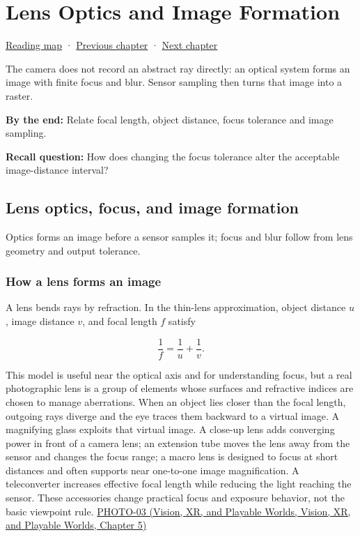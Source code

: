 \hypertarget{03-visual-computing-i-ch003}{}
\chapter{Lens Optics and Image Formation}\label{stagechapter:03-visual-computing-i-ch003}\label{03-visual-computing-i-ch003-lens-optics-and-image-formation}

\hyperref[volume-reading-map]{Reading map} · \hyperref[03-visual-computing-i-ch002-surfaces-topology-and-parameterization]{Previous chapter} · \hyperref[03-visual-computing-i-ch004-sampling-filtering-and-reconstruction]{Next chapter}

The camera does not record an abstract ray directly: an optical system forms an image with finite focus and blur. Sensor sampling then turns that image into a raster.

\textbf{By the end:} Relate focal length, object distance, focus tolerance and image sampling.

\textbf{Recall question:} How does changing the focus tolerance alter the acceptable image-distance interval?

\section{Lens optics, focus, and image formation}\label{03-visual-computing-i-ch003-lens-optics-focus-and-image-formation}

Optics forms an image before a sensor samples it; focus and blur follow from lens geometry and output tolerance.

\subsection{How a lens forms an image}\label{03-visual-computing-i-ch003-how-a-lens-forms-an-image}

A lens bends rays by refraction. In the thin-lens approximation, object distance \(u\), image distance \(v\), and focal length \(f\) satisfy

\[
\frac{1}{f}=\frac{1}{u}+\frac{1}{v}.
\]

This model is useful near the optical axis and for understanding focus, but a real photographic lens is a group of elements whose surfaces and refractive indices are chosen to manage aberrations. When an object lies closer than the focal length, outgoing rays diverge and the eye traces them backward to a virtual image. A magnifying glass exploits that virtual image. A close-up lens adds converging power in front of a camera lens; an extension tube moves the lens away from the sensor and changes the focus range; a macro lens is designed to focus at short distances and often supports near one-to-one image magnification. A teleconverter increases effective focal length while reducing the light reaching the sensor. These accessories change practical focus and exposure behavior, not the basic viewpoint rule. \href{../07-Vision-XR-and-Playable-Worlds/main.pdf\#nameddest=04-visual-computing-ii-ch036-photo-03---photography-session-03}{PHOTO-03 (Vision, XR, and Playable Worlds, Vision, XR, and Playable Worlds, Chapter 5)}

